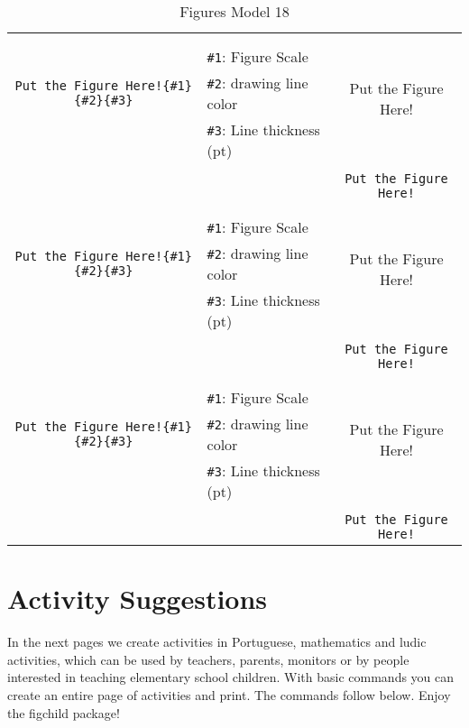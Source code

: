 \documentclass[x11names]{article}
\begin{document}
\begin{table}[H]
\begin{tabular}{|c|l|c|}
	&&\multirow{5}{*}{Put the Figure Here!}\\	&&\\	&\verb|#1|: Figure Scale &\\	\verb|Put the Figure Here!{#1}{#2}{#3}|&	\verb|#2|: drawing line color &\\	&\verb|#3|: Line thickness (pt) &\\ &&\\&&	\verb|Put the Figure Here!|\\\hline 	
	&&\multirow{5}{*}{Put the Figure Here!}\\	&&\\	&\verb|#1|: Figure Scale &\\	\verb|Put the Figure Here!{#1}{#2}{#3}|&	\verb|#2|: drawing line color &\\	&\verb|#3|: Line thickness (pt) &\\ &&\\&&	\verb|Put the Figure Here!|\\\hline 	
	&&\multirow{5}{*}{Put the Figure Here!}\\	&&\\	&\verb|#1|: Figure Scale &\\	\verb|Put the Figure Here!{#1}{#2}{#3}|&	\verb|#2|: drawing line color &\\	&\verb|#3|: Line thickness (pt) &\\ &&\\&&	\verb|Put the Figure Here!|\\\hline 	\hline\end{tabular}\caption{Figures Model 18}\label{tab18}\end{table}

\newpage

\section{Activity Suggestions}

In the next pages we create activities in Portuguese, mathematics and ludic activities, which can be used by teachers, parents, monitors or by people interested in teaching elementary school children. With basic commands you can create an entire page of activities and print. The commands follow below. Enjoy the figchild package!

\vspace{3cm}
\end{document}
